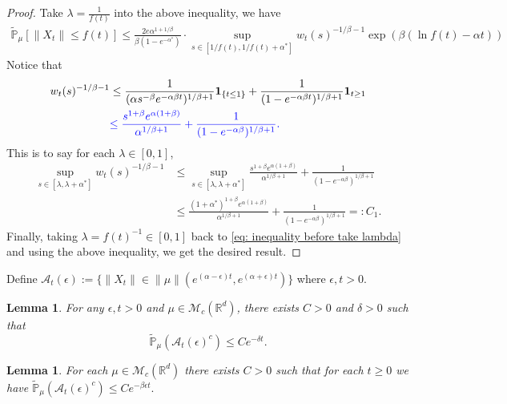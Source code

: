 \documentclass[12pt,oneside,english]{amsart}
\theoremstyle{plain}
\newtheorem{lem}[thm]{Lemma}
\theoremstyle{definition}
\numberwithin{equation}{section}
\newcommand{\added}[1]{{\color{blue}#1}}\newcommand{\deleted}[1]{{\color{red}#1}}
\begin{document}
\begin{proof}
\deleted{
Take $\lambda=\frac{1}{f(t)}$ into the above inequality, we have
\begin{align*}
    \mathbb{\tilde{P}}_{\mu}[\|X_t\|\leq f(t)]\leq \frac{2 e \alpha^{1+1/\beta}}{\beta (1-e^{-\alpha^*})}\cdot\sup_{s\in [1/f(t),1/f(t)+\alpha^*]}w_t(s)^{-1/\beta-1}\exp(\beta(\ln f(t)-\alpha t))
\end{align*}
}
Notice that
\begin{align*}
    w_t(s)^{-1/\beta-1}&\leq \frac{1}{(\alpha s^{-\beta}e^{-\alpha \beta t})^{1/
    \beta+1}}\mathbf{1}_{\{t\leq 1\}}+\frac{1}{(1-e^{-\alpha\beta t})^{1/\beta+1}}\mathbf{1}_{t\geq 1}\\
    &\added{\leq \frac{s^{1+\beta}e^{\alpha(1+\beta)}}{\alpha^{1/\beta +1}}+\frac{1}{(1-e^{-\alpha\beta })^{1/\beta+1}}.}
\end{align*}
This is to say \added{for each $\lambda \in [0,1]$,
\begin{align*}
    \sup_{s\in [\lambda,\lambda+\alpha^*]}w_t(s)^{-1/\beta-1}
    &\leq\sup_{s\in [\lambda,\lambda+\alpha^*]}\frac{s^{1+\beta}e^{\alpha(1+\beta)}}{\alpha^{1/\beta +1}}+\frac{1}{(1-e^{-\alpha\beta })^{1/\beta+1}}\\
    &\leq \frac{(1+\alpha^*)^{1+\beta}e^{\alpha(1+\beta)}}{\alpha^{1/\beta+1}}+\frac{1}{(1-e^{-\alpha\beta })^{1/\beta+1}} =: C_1.
\end{align*}
}
\added{Finally, taking $\lambda = f(t)^{-1} \in [0,1]$ back to \eqref{eq: inequality before take lambda} and using the above inequality, we get the desired result.}
\end{proof}
	Define $\mathcal{A}_t(\epsilon):=\{ \|X_t\|\in \|\mu\|(e^{(\alpha-\epsilon)t},e^{(\alpha+\epsilon)t})\}$ where $\epsilon,t>0$.
\deleted{
\begin{lem}\label{lem: control of AT}
  For any $\epsilon,t>0$ and $\mu \in \mathcal{M}_c(\mathbb{R}^d)$, there exists $C>0$ and $\delta>0$ such that
  $$\mathbb{\tilde{P}}_{\mu}\left(\mathcal{A}_t(\epsilon)^c\right)\leq C e^{-\delta t}.$$
\end{lem}
}
\added{
\begin{lem}\label{lem: control of AT}
  For each $\mu \in \mathcal{M}_c(\mathbb{R}^d)$ there exists $C>0$ such that for each $t\geq 0$ we have
  $
  \mathbb{\tilde{P}}_{\mu}\left(\mathcal{A}_t(\epsilon)^c\right)\leq C e^{-\beta\epsilon t}.
  $
\end{lem}
}
\end{document}
